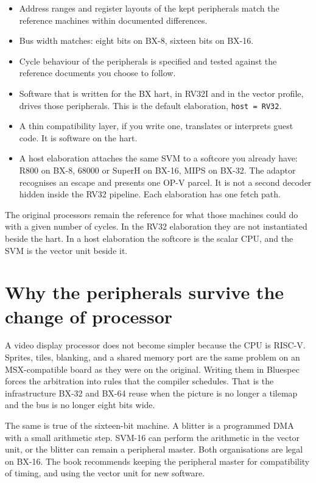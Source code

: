 \begin{itemize}[leftmargin=1.5em]
  \item Address ranges and register layouts of the kept peripherals match the reference machines within documented differences.
  \item Bus width matches: eight bits on BX-8, sixteen bits on BX-16.
  \item Cycle behaviour of the peripherals is specified and tested against the reference documents you choose to follow.
  \item Software that is written for the BX hart, in RV32I and in the vector profile, drives those peripherals. This is the default elaboration, \texttt{host = RV32}.
  \item A thin compatibility layer, if you write one, translates or interprets guest code. It is software on the hart.
  \item A host elaboration attaches the same SVM to a softcore you already have: R800 on BX-8, 68000 or SuperH on BX-16, MIPS on BX-32. The adaptor recognises an escape and presents one OP-V parcel. It is not a second decoder hidden inside the RV32 pipeline. Each elaboration has one fetch path.
\end{itemize}

The original processors remain the reference for what those machines could do with a given number of cycles. In the RV32 elaboration they are not instantiated beside the hart. In a host elaboration the softcore is the scalar CPU, and the SVM is the vector unit beside it.

\section{Why the peripherals survive the change of processor}

A video display processor does not become simpler because the CPU is RISC-V. Sprites, tiles, blanking, and a shared memory port are the same problem on an MSX-compatible board as they were on the original. Writing them in Bluespec forces the arbitration into rules that the compiler schedules. That is the infrastructure BX-32 and BX-64 reuse when the picture is no longer a tilemap and the bus is no longer eight bits wide.

The same is true of the sixteen-bit machine. A blitter is a programmed DMA with a small arithmetic step. SVM-16 can perform the arithmetic in the vector unit, or the blitter can remain a peripheral master. Both organisations are legal on BX-16. The book recommends keeping the peripheral master for compatibility of timing, and using the vector unit for new software.

